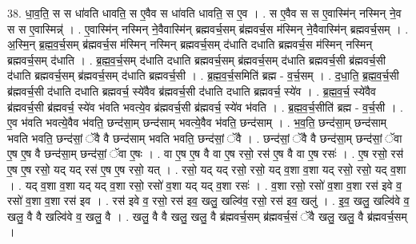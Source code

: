 \documentclass[17pt]{extarticle}
\begin{document}
38. धा॒व॒ति॒ स स धा॑वति धावति॒ स ए॒वैव स धा॑वति धावति॒ स ए॒व । . स ए॒वैव स स ए॒वास्मि॑न् नस्मिन् ने॒व स स ए॒वास्मिन्न्॑ । . ए॒वास्मि॑न् नस्मिन् ने॒वैवास्मि॑न् ब्रह्मवर्च॒सम् ब्र॑ह्मवर्च॒स म॑स्मिन् ने॒वैवास्मि॑न् ब्रह्मवर्च॒सम् । . अ॒स्मि॒न् ब्र॒ह्म॒व॒र्च॒सम् ब्र॑ह्मवर्च॒स म॑स्मिन् नस्मिन् ब्रह्मवर्च॒सम् द॑धाति दधाति ब्रह्मवर्च॒स म॑स्मिन् नस्मिन् ब्रह्मवर्च॒सम् द॑धाति । . ब्र॒ह्म॒व॒र्च॒सम् द॑धाति दधाति ब्रह्मवर्च॒सम् ब्र॑ह्मवर्च॒सम् द॑धाति ब्रह्मवर्च॒सी ब्र॑ह्मवर्च॒सी द॑धाति ब्रह्मवर्च॒सम् ब्र॑ह्मवर्च॒सम् द॑धाति ब्रह्मवर्च॒सी । . ब्र॒ह्म॒व॒र्च॒समिति॑ ब्रह्म - व॒र्च॒सम् । . द॒धा॒ति॒ ब्र॒ह्म॒व॒र्च॒सी ब्र॑ह्मवर्च॒सी द॑धाति दधाति ब्रह्मवर्च॒ स्ये॑वैव ब्र॑ह्मवर्च॒सी द॑धाति दधाति ब्रह्मवर्च॒ स्ये॑व । . ब्र॒ह्म॒व॒र्च॒ स्ये॑वैव ब्र॑ह्मवर्च॒सी ब्र॑ह्मवर्च॒ स्ये॑व भ॑वति भवत्ये॒व ब्र॑ह्मवर्च॒सी ब्र॑ह्मवर्च॒ स्ये॑व भ॑वति । . ब्र॒ह्म॒व॒र्च॒सीति॑ ब्रह्म - व॒र्च॒सी । . ए॒व भ॑वति भवत्ये॒वैव भ॑वति॒ छन्द॑सा॒म् छन्द॑साम् भवत्ये॒वैव भ॑वति॒ छन्द॑साम् । . भ॒व॒ति॒ छन्द॑सा॒म् छन्द॑साम् भवति भवति॒ छन्द॑सां॒ ॅवै वै छन्द॑साम् भवति भवति॒ छन्द॑सां॒ ॅवै । . छन्द॑सां॒ ॅवै वै छन्द॑सा॒म् छन्द॑सां॒ ॅवा ए॒ष ए॒ष वै छन्द॑सा॒म् छन्द॑सां॒ ॅवा ए॒षः । . वा ए॒ष ए॒ष वै वा ए॒ष रसो॒ रस॑ ए॒ष वै वा ए॒ष रसः॑ । . ए॒ष रसो॒ रस॑ ए॒ष ए॒ष रसो॒ यद् यद् रस॑ ए॒ष ए॒ष रसो॒ यत् । . रसो॒ यद् यद् रसो॒ रसो॒ यद् व॒शा व॒शा यद् रसो॒ रसो॒ यद् व॒शा । . यद् व॒शा व॒शा यद् यद् व॒शा रसो॒ रसो॑ व॒शा यद् यद् व॒शा रसः॑ । . व॒शा रसो॒ रसो॑ व॒शा व॒शा रस॑ इवे व॒ रसो॑ व॒शा व॒शा रस॑ इव । . रस॑ इवे व॒ रसो॒ रस॑ इव॒ खलु॒ खल्वि॑व॒ रसो॒ रस॑ इव॒ खलु॑ । . इ॒व॒ खलु॒ खल्वि॑वे व॒ खलु॒ वै वै खल्वि॑वे व॒ खलु॒ वै । . खलु॒ वै वै खलु॒ खलु॒ वै ब्र॑ह्मवर्च॒सम् ब्र॑ह्मवर्च॒सं ॅवै खलु॒ खलु॒ वै ब्र॑ह्मवर्च॒सम् । \newline
\pagebreak
{}
\end{document}
